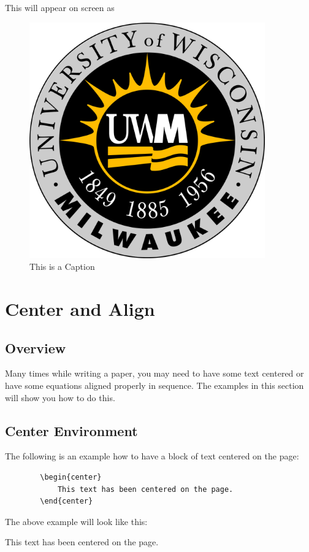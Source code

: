\documentclass[]{article}
\newcommand{\dent}{\hspace{\parindent}} %
\begin{document}
    This will appear on screen as
    \begin{figure}
        \centering
        \includegraphics[width=4in]{uwm.png}
        \caption{This is a Caption}
    \end{figure}

    \section{Center and Align}
    \subsection{Overview}
    \dent Many times while writing a paper, you may need to have some text centered or have some equations aligned properly in sequence. The examples in this section will show you how to do this.
    \subsection{Center Environment}
    \dent The following is an example how to have a block of text centered on the page:
    \begin{verbatim}
        \begin{center}
            This text has been centered on the page.
        \end{center}
    \end{verbatim}
    The above example will look like this:
    \begin{center}
        This text has been centered on the page.
    \end{center}
\end{document}
